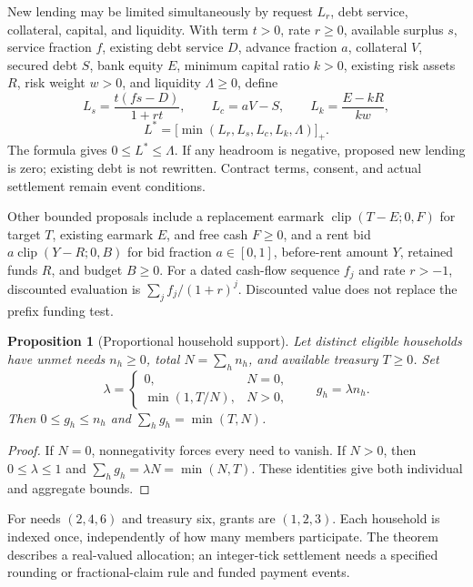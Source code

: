 \documentclass[11pt,a4paper]{article}
\newtheorem{proposition}[theorem]{Proposition}
\begin{document}
New lending may be limited simultaneously by request $L_r$, debt service, collateral, capital, and liquidity. With term $t>0$, rate $r\geq0$, available surplus $s$, service fraction $f$, existing debt service $D$, advance fraction $a$, collateral $V$, secured debt $S$, bank equity $E$, minimum capital ratio $k>0$, existing risk assets $R$, risk weight $w>0$, and liquidity $\Lambda\geq0$, define
\begin{equation}
L_s=\frac{t(fs-D)}{1+rt},\qquad
L_c=aV-S,\qquad L_k=\frac{E-kR}{kw},
\end{equation}
\begin{equation}
L^*=\bigl[\min(L_r,L_s,L_c,L_k,\Lambda)\bigr]_+.
\end{equation}
The formula gives $0\leq L^*\leq\Lambda$. If any headroom is negative, proposed new lending is zero; existing debt is not rewritten. Contract terms, consent, and actual settlement remain event conditions.

Other bounded proposals include a replacement earmark $\operatorname{clip}(T-E;0,F)$ for target $T$, existing earmark $E$, and free cash $F\geq0$, and a rent bid $a\operatorname{clip}(Y-R;0,B)$ for bid fraction $a\in[0,1]$, before-rent amount $Y$, retained funds $R$, and budget $B\geq0$. For a dated cash-flow sequence $f_j$ and rate $r>-1$, discounted evaluation is $\sum_j f_j/(1+r)^j$. Discounted value does not replace the prefix funding test.

\begin{proposition}[Proportional household support]
Let distinct eligible households have unmet needs $n_h\geq0$, total $N=\sum_h n_h$, and available treasury $T\geq0$. Set
\begin{equation}
\lambda=\begin{cases}0,&N=0,\\\min(1,T/N),&N>0,\end{cases}
\qquad g_h=\lambda n_h.
\end{equation}
Then $0\leq g_h\leq n_h$ and $\sum_h g_h=\min(T,N)$.
\end{proposition}
\begin{proof}
If $N=0$, nonnegativity forces every need to vanish. If $N>0$, then $0\leq\lambda\leq1$ and $\sum_hg_h=\lambda N=\min(N,T)$. These identities give both individual and aggregate bounds.
\end{proof}

For needs $(2,4,6)$ and treasury six, grants are $(1,2,3)$. Each household is indexed once, independently of how many members participate. The theorem describes a real-valued allocation; an integer-tick settlement needs a specified rounding or fractional-claim rule and funded payment events.
\end{document}
